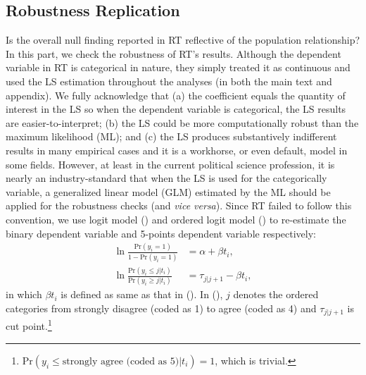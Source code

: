 \documentclass[11pt]{article}
\begin{document}
\subsection*{Robustness Replication}
Is the overall null finding reported in RT reflective of the population relationship? In this part, we check the robustness of RT's results. Although the dependent variable in RT is categorical in nature, they simply treated it as continuous and used the LS estimation throughout the analyses (in both the main text and appendix). We fully acknowledge that (a) the coefficient equals the quantity of interest in the LS so when the dependent variable is categorical, the LS results are easier-to-interpret; (b) the LS could be more computationally robust than the maximum likelihood (ML); and (c) the LS produces substantively indifferent results in many empirical cases and it is a workhorse, or even default, model in some fields. However, at least in the current political science profession, it is nearly an industry-standard that when the LS is used for the categorically variable, a generalized linear model (GLM) estimated by the ML should be applied for the robustness checks (and \emph{vice versa}). Since RT failed to follow this convention, we use logit model () and ordered logit model () to re-estimate the binary dependent variable and 5-points dependent variable respectively:
\begin{align}
\ln\frac{\text{Pr}(y_i = 1)}{1 - \text{Pr}(y_i = 1)} & = \alpha + \beta t_{i},\\
\ln\frac{\text{Pr}(y_i \leq j|t_i)}{\text{Pr}(y_i \geq j|t_i)} & = \tau_{j|j+1} - \beta t_i,
\end{align}
in which \(\beta t_i\) is defined as same as that in (). In (), \(j\) denotes the ordered categories from strongly disagree (coded as 1) to agree (coded as 4) and \(\tau_{j|j+1}\) is cut point.\footnote{\(\text{Pr}(y_i \leq \text{strongly agree (coded as 5)}|t_i) = 1\), which is trivial.}
\end{document}
